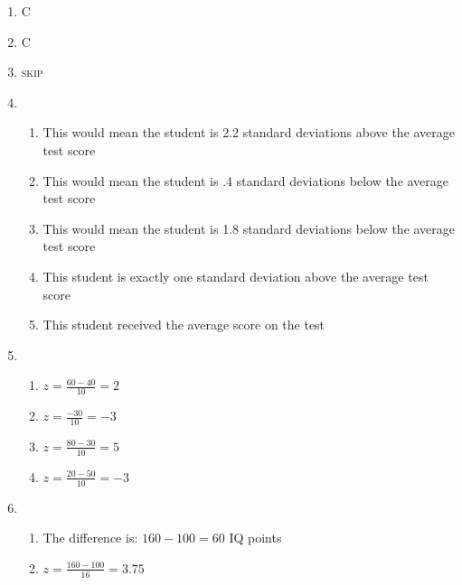 \documentclass[12pt]{article}
\begin{document}
\begin{enumerate}
  \item C

  \item C

  \item \textsc{skip}

  \item

    \begin{enumerate}

      \item This would mean the student is 2.2 standard deviations above the average test score

      \item This would mean the student is .4 standard deviations below the average test score

      \item This would mean the student is 1.8 standard deviations below the average test score

      \item This student is exactly one standard deviation above the average test score

      \item This student received the average score on the test

    \end{enumerate}

  \item

    \begin{enumerate}

      \item $z=\frac{60-40}{10}=2$

      \item $z=\frac{-30}{10}=-3$

      \item $z=\frac{80-30}{10}=5$

      \item $z=\frac{20-50}{10}=-3$

    \end{enumerate}

  \item

    \begin{enumerate}

      \item The difference is: $160-100=60$ IQ points

      \item $z=\frac{160-100}{16}=3.75$


\end{enumerate}
\end{enumerate}
\end{document}
